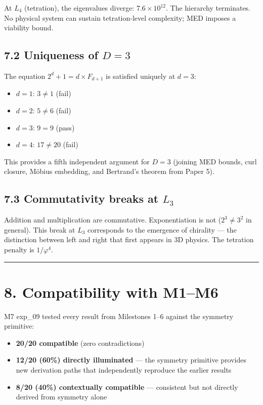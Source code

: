 \documentclass[11pt,a4paper]{article}
\providecommand{\tightlist}{\setlength{\itemsep}{0pt}\setlength{\parskip}{0pt}}
\begin{document}
At $L_4$ (tetration), the eigenvalues diverge: $7.6 \times 10^{12}$. The hierarchy terminates. No physical system can sustain tetration-level complexity; MED imposes a viability bound.

\subsection*{7.2 Uniqueness of $D = 3$}

The equation $2^d + 1 = d \times F_{d+1}$ is satisfied uniquely at $d = 3$:
\begin{itemize}\tightlist
\item $d = 1$: $3 \neq 1$ (fail)
\item $d = 2$: $5 \neq 6$ (fail)
\item $d = 3$: $9 = 9$ (pass)
\item $d = 4$: $17 \neq 20$ (fail)
\end{itemize}

This provides a fifth independent argument for $D = 3$ (joining MED bounds, curl closure, Möbius embedding, and Bertrand's theorem from Paper 5).

\subsection*{7.3 Commutativity breaks at $L_3$}

Addition and multiplication are commutative. Exponentiation is not ($2^3 \neq 3^2$ in general). This break at $L_3$ corresponds to the emergence of chirality — the distinction between left and right that first appears in 3D physics. The tetration penalty is $1/\varphi^4$.

\begin{center}\rule{0.5\linewidth}{0.4pt}\end{center}

\section*{8. Compatibility with M1–M6}

M7 exp\_09 tested every result from Milestones 1–6 against the symmetry primitive:

\begin{itemize}\tightlist
\item \textbf{20/20 compatible} (zero contradictions)
\item \textbf{12/20 (60\%) directly illuminated} — the symmetry primitive provides new derivation paths that independently reproduce the earlier results
\item \textbf{8/20 (40\%) contextually compatible} — consistent but not directly derived from symmetry alone
\end{itemize}
\end{document}
